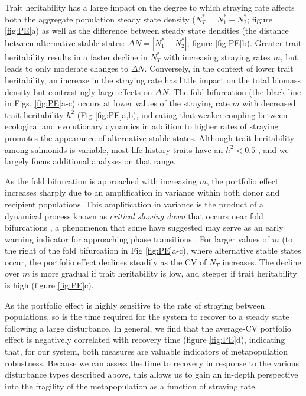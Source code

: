 \documentclass{revtex4}
\begin{document}
Trait heritability has a large impact on the degree to which straying rate affects both the aggregate population steady state density ($N^*_T=N^*_1+N^*_2$; figure \ref{fig:PE}a) as well as the difference between steady state densities (the distance between alternative stable states: $\Delta N=|N^*_1-N^*_2|$; figure \ref{fig:PE}b).
Greater trait heritability results in a faster decline in $N_T^*$ with increasing straying rates $m$, but leads to only moderate changes to $\Delta N$.
Conversely, in the context of lower trait heritability, an increase in the straying rate has little impact on the total biomass density but contrastingly large effects on $\Delta N$.
The fold bifurcation (the black line in Figs. \ref{fig:PE}a-c) occurs at lower values of the straying rate $m$ with decreased trait heritability $h^2$ (Fig \ref{fig:PE}a,b), indicating that weaker coupling between ecological and evolutionary dynamics in addition to higher rates of straying promotes the appearance of alternative stable states.
Although trait heritability among salmonids is variable, most life history traits have an $h^2 <0.5$ \citep{Carlson:2008hl}, and we largely focus additional analyses on that range.

As the fold bifurcation is approached with increasing $m$, the portfolio effect increases sharply due to an amplification in variance within both donor and recipient populations.
This amplification in variance is the product of a dynamical process known as \emph{critical slowing down} that occurs near fold bifurcations \citep{Scheffer:2009gg}, a phenomenon that some have suggested may serve as an early warning indicator for approaching phase transitions \citep{Scheffer:2009gg,Lade:2012eu,Anonymous:2013br,Dakos:2014br,Krkosek:2014ch}.
For larger values of $m$ (to the right of the fold bifurcation in Fig \ref{fig:PE}a-c), where alternative stable states occur, the portfolio effect declines steadily as the CV of $N_T$ increases.
The decline over $m$ is more gradual if trait heritability is low, and steeper if trait heritability is high (figure \ref{fig:PE}c).

As the portfolio effect is highly sensitive to the rate of straying between populations, so is the time required for the system to recover to a steady state following a large disturbance.
In general, we find that the average-CV portfolio effect is negatively correlated with recovery time (figure \ref{fig:PE}d), indicating that, for our system, both measures are valuable indicators of metapopulation robustness.
Because we can assess the time to recovery in response to the various disturbance types described above, this allows us to gain an in-depth perspective into the fragility of the metapopulation as a function of straying rate.
\end{document}
